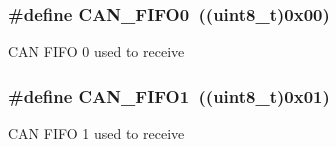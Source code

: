 \subsubsection[{C\+A\+N\+\_\+\+F\+I\+F\+O0}]{\setlength{\rightskip}{0pt plus 5cm}\#define C\+A\+N\+\_\+\+F\+I\+F\+O0~((uint8\+\_\+t)0x00)}\label{group___c_a_n__receive___f_i_f_o__number__constants_ga8f52eeefb86b2af5b7c3b4b75fa4d114}
C\+A\+N F\+I\+F\+O 0 used to receive \hypertarget{group___c_a_n__receive___f_i_f_o__number__constants_gafbcf3f13dbf61030ab7a812595ba9850}{}
\subsubsection[{C\+A\+N\+\_\+\+F\+I\+F\+O1}]{\setlength{\rightskip}{0pt plus 5cm}\#define C\+A\+N\+\_\+\+F\+I\+F\+O1~((uint8\+\_\+t)0x01)}\label{group___c_a_n__receive___f_i_f_o__number__constants_gafbcf3f13dbf61030ab7a812595ba9850}
C\+A\+N F\+I\+F\+O 1 used to receive 